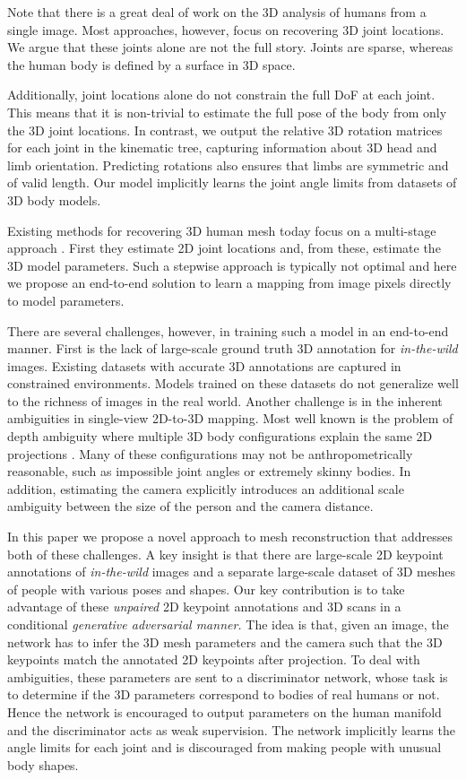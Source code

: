 \documentclass[10pt,twocolumn,letterpaper]{article}
\begin{document}
Note that there is a great deal of work on the 3D analysis of humans from a single
image. 
Most approaches, however, focus on recovering 3D joint
locations. We argue that these joints alone are not the full story. 
Joints are sparse, whereas the human body is defined by a surface in
3D space.

Additionally, joint locations alone do not constrain the full DoF at each joint.
This means that it is non-trivial to estimate the full pose of the
body from only the 3D joint locations.
In contrast, we output the relative 3D rotation matrices for each
joint in the kinematic tree, capturing information about
3D head and limb orientation. Predicting rotations also ensures that limbs are symmetric and of valid length. Our model implicitly learns the
joint angle limits from datasets of 3D body models. 

Existing methods for recovering 3D human mesh today focus on a multi-stage
approach \cite{SMPLify,UP}.
First they estimate 2D joint locations and, from these, estimate the 3D model parameters.
Such a stepwise approach is typically not optimal and here we propose
an end-to-end solution to learn a mapping from image pixels directly to model parameters.

There are several challenges, however, in training such a model in an end-to-end
manner. First is the lack of large-scale ground truth 3D annotation for \emph{in-the-wild}
images. Existing datasets with accurate 3D annotations are captured in
constrained environments. Models trained on these datasets do not generalize well
to the richness of images in the real world. 
Another challenge is in the inherent ambiguities in single-view 2D-to-3D
mapping. Most well known is the problem of depth ambiguity where multiple 3D
body configurations explain the same 2D projections \cite{Taylor:2000}. Many of these configurations may not be
anthropometrically reasonable, such as impossible joint angles or extremely
skinny bodies. In addition, estimating the camera explicitly introduces an
additional scale ambiguity between the size of the person and the camera distance.

In this paper we propose a novel approach to mesh reconstruction that addresses
both of these challenges. 
A key insight is that there are large-scale 2D
keypoint annotations of \emph{in-the-wild} images and a separate
large-scale dataset of 3D meshes of people with various poses and shapes. 
Our key contribution is to take advantage of these
\emph{unpaired} 2D keypoint annotations and 3D scans in a conditional
{\em generative adversarial manner.}
The idea is that, given an image, the network has to infer the 3D mesh parameters
and the camera such that the 3D keypoints match the annotated 2D keypoints after projection. To deal with ambiguities, these parameters are sent to a
discriminator network, whose task is to determine if the 3D parameters correspond to bodies of real humans or not. 
Hence the network is encouraged to output parameters on the human
manifold and the discriminator acts as weak supervision. The network implicitly learns the angle limits for each joint and is
discouraged from making people with unusual body shapes. 
\end{document}
